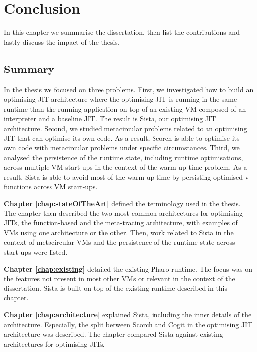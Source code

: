 \documentclass[a4paper,12pt,twoside]{../includes/ThesisStyle}
\begin{document}
\fi

\chapter{Conclusion}
\label{chap:conclusion}
\minitoc

In this chapter we summarise the dissertation, then list the contributions and lastly discuss the impact of the thesis.

\section{Summary}

In the thesis we focused on three problems. First, we investigated how to build an optimising JIT architecture where the optimising JIT is running in the same runtime than the running application on top of an existing VM composed of an interpreter and a baseline JIT. The result is Sista, our optimising JIT architecture. Second, we studied metacircular problems related to an optimising JIT that can optimise its own code. As a result, Scorch is able to optimise its own code with metacircular problems under specific circumstances. Third, we analysed the persistence of the runtime state, including runtime optimisations, across multiple VM start-ups in the context of the warm-up time problem. As a result, Sista is able to avoid most of the warm-up time by persisting optimised v-functions across VM start-ups.

\textbf{Chapter \ref{chap:stateOfTheArt}} defined the terminology used in the thesis. The chapter then described the two most common architectures for optimising JITs, the function-based and the meta-tracing architecture, with examples of VMs using one architecture or the other. Then, work related to Sista in the context of metacircular VMs and the persistence of the runtime state across start-ups were listed.

\textbf{Chapter \ref{chap:existing}} detailed the existing Pharo runtime. The focus was on the features not present in most other VMs or relevant in the context of the dissertation. Sista is built on top of the existing runtime described in this chapter.

\textbf{Chapter \ref{chap:architecture}} explained Sista, including the inner details of the architecture. Especially, the split between Scorch and Cogit in the optimising JIT architecture was described. The chapter compared Sista against existing architectures for optimising JITs.
\end{document}

